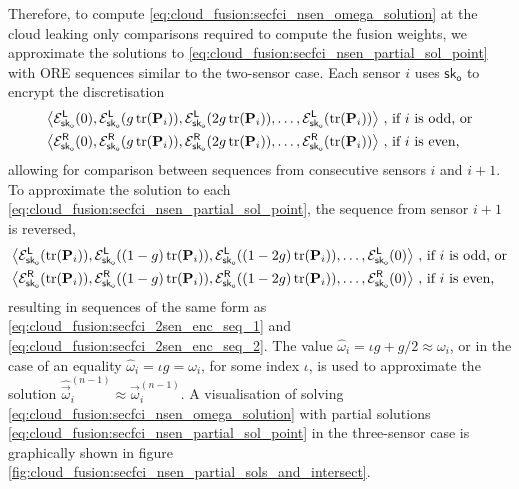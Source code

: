 Therefore, to compute \eqref{eq:cloud_fusion:secfci_nsen_omega_solution} at the cloud leaking only comparisons required to compute the fusion weights, we approximate the solutions to \eqref{eq:cloud_fusion:secfci_nsen_partial_sol_point} with ORE sequences similar to the two-sensor case. Each sensor $i$ uses $\mathsf{sk}_{\mathsf{o}}$ to encrypt the discretisation 
\begin{equation}\label{eq:cloud_fusion:secfci_nsen_enc_seqs}
    \begin{split}
        \left\langle\mathcal{E}^{\mathsf{L}}_{\mathsf{sk}_{\mathsf{o}}}(0), \mathcal{E}^{\mathsf{L}}_{\mathsf{sk}_{\mathsf{o}}}(g\tr(\mat{P}_i)), \mathcal{E}^{\mathsf{L}}_{\mathsf{sk}_{\mathsf{o}}}(2g\tr(\mat{P}_i)),\dots,\mathcal{E}^{\mathsf{L}}_{\mathsf{sk}_{\mathsf{o}}}(\tr(\mat{P}_i))\right\rangle\,,\ & \text{if } i \text{ is odd, or}\\
        \left\langle\mathcal{E}^{\mathsf{R}}_{\mathsf{sk}_{\mathsf{o}}}(0), \mathcal{E}^{\mathsf{R}}_{\mathsf{sk}_{\mathsf{o}}}(g\tr(\mat{P}_i)), \mathcal{E}^{\mathsf{R}}_{\mathsf{sk}_{\mathsf{o}}}(2g\tr(\mat{P}_i)),\dots,\mathcal{E}^{\mathsf{R}}_{\mathsf{sk}_{\mathsf{o}}}(\tr(\mat{P}_i))\right\rangle\,,\ & \text{if } i \text{ is even,}
    \end{split}
\end{equation}
allowing for comparison between sequences from consecutive sensors $i$ and $i+1$. To approximate the solution to each \eqref{eq:cloud_fusion:secfci_nsen_partial_sol_point}, the sequence from sensor $i+1$ is reversed,
\begin{equation}\label{eq:cloud_fusion:secfci_nsen_enc_seqs_reversed}
    \begin{split}
        \left\langle\mathcal{E}^{\mathsf{L}}_{\mathsf{sk}_{\mathsf{o}}}(\tr(\mat{P}_i)),\mathcal{E}^{\mathsf{L}}_{\mathsf{sk}_{\mathsf{o}}}((1-g)\tr(\mat{P}_i)), \mathcal{E}^{\mathsf{L}}_{\mathsf{sk}_{\mathsf{o}}}((1-2g)\tr(\mat{P}_i)),\dots,\mathcal{E}^{\mathsf{L}}_{\mathsf{sk}_{\mathsf{o}}}(0)\right\rangle\,,\ & \text{if } i \text{ is odd, or}\\
        \left\langle\mathcal{E}^{\mathsf{R}}_{\mathsf{sk}_{\mathsf{o}}}(\tr(\mat{P}_i)), \mathcal{E}^{\mathsf{R}}_{\mathsf{sk}_{\mathsf{o}}}((1-g)\tr(\mat{P}_i)), \mathcal{E}^{\mathsf{R}}_{\mathsf{sk}_{\mathsf{o}}}((1-2g)\tr(\mat{P}_i)),\dots,\mathcal{E}^{\mathsf{R}}_{\mathsf{sk}_{\mathsf{o}}}(0)\right\rangle\,,\ & \text{if } i \text{ is even,}
    \end{split}
\end{equation}
resulting in sequences of the same form as \eqref{eq:cloud_fusion:secfci_2sen_enc_seq_1} and \eqref{eq:cloud_fusion:secfci_2sen_enc_seq_2}. The value $\hat{\omega}_i = \iota g + g/2 \approx \omega_i$, or in the case of an equality $\hat{\omega}_i = \iota g = \omega_i$, for some index $\iota$, is used to approximate the solution $\hat{\vec{\omega}}_i^{(n-1)} \approx \vec{\omega}_i^{(n-1)}$. A visualisation of solving \eqref{eq:cloud_fusion:secfci_nsen_omega_solution} with partial solutions \eqref{eq:cloud_fusion:secfci_nsen_partial_sol_point} in the three-sensor case is graphically shown in figure \ref{fig:cloud_fusion:secfci_nsen_partial_sols_and_intersect}.
